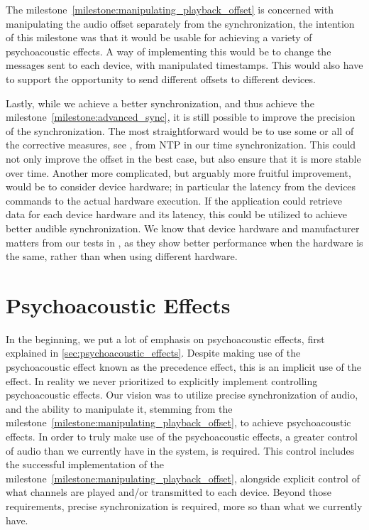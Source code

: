 \bigskip
The milestone~\ref{milestone:manipulating_playback_offset} is concerned with manipulating the audio offset separately from the synchronization, the intention of this milestone was that it would be usable for achieving a variety of psychoacoustic effects.
A way of implementing this would be to change the  messages sent to each device, with manipulated timestamps.
This would also have to support the opportunity to send different offsets to different devices.

\bigskip
Lastly, while we achieve a better synchronization, and thus achieve the milestone~\ref{milestone:advanced_sync}, it is still possible to improve the precision of the synchronization.
The most straightforward would be to use some or all of the corrective measures, see , from \ac{NTP} in our time synchronization.
This could not only improve the offset in the best case, but also ensure that it is more stable over time.
Another more complicated, but arguably more fruitful improvement, would be to consider device hardware; in particular the latency from the devices commands to the actual hardware execution.
If the application could retrieve data for each device hardware and its latency, this could be utilized to achieve better audible synchronization.
We know that device hardware and manufacturer matters from our tests in , as they show better performance when the hardware is the same, rather than when using different hardware.

\section{Psychoacoustic Effects}
In the beginning, we put a lot of emphasis on psychoacoustic effects, first explained in \cref{sec:psychoacoustic_effects}.
Despite making use of the psychoacoustic effect known as the precedence effect, this is an implicit use of the effect.
In reality we never prioritized to explicitly implement controlling psychoacoustic effects.
Our vision was to utilize precise synchronization of audio, and the ability to manipulate it, stemming from the milestone~\ref{milestone:manipulating_playback_offset}, to achieve psychoacoustic effects.
In order to truly make use of the psychoacoustic effects, a greater control of audio than we currently have in the system, is required.
This control includes the successful implementation of the milestone~\ref{milestone:manipulating_playback_offset}, alongside explicit control of what channels are played and/or transmitted to each device.
Beyond those requirements, precise synchronization is required, more so than what we currently have.

